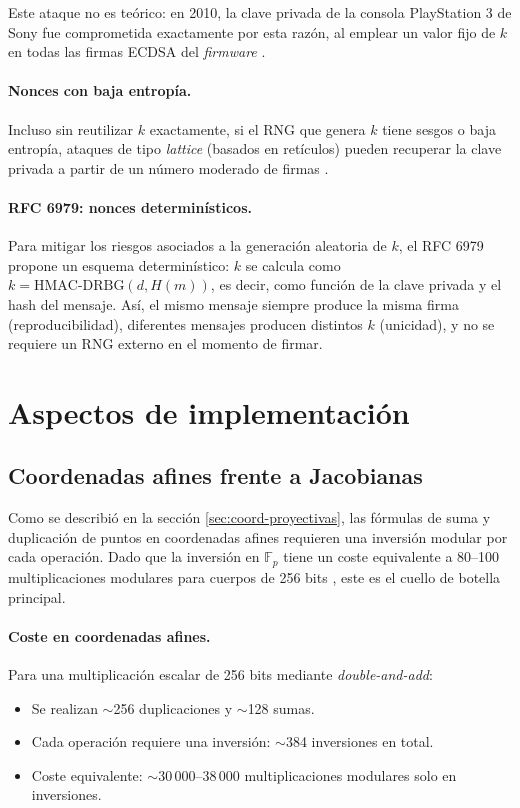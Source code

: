 Este ataque no es teórico: en 2010, la clave privada de la consola PlayStation 3 de Sony fue comprometida exactamente por esta razón, al emplear un valor fijo de $k$ en todas las firmas ECDSA del \textit{firmware} \cite{ps3-ecdsa-fail}.

\paragraph{Nonces con baja entropía.}
Incluso sin reutilizar $k$ exactamente, si el RNG que genera $k$ tiene sesgos o baja entropía, ataques de tipo \textit{lattice} (basados en retículos) pueden recuperar la clave privada a partir de un número moderado de firmas \cite{howgrave2001lattice}. 

\paragraph{RFC 6979: nonces determinísticos.}
Para mitigar los riesgos asociados a la generación aleatoria de $k$, el RFC 6979 \cite{rfc6979} propone un esquema determinístico: $k$ se calcula como $k = \text{HMAC-DRBG}(d, H(m))$, es decir, como función de la clave privada y el hash del mensaje. Así, el mismo mensaje siempre produce la misma firma (reproducibilidad), diferentes mensajes producen distintos $k$ (unicidad), y no se requiere un RNG externo en el momento de firmar.


\section{Aspectos de implementación}
\label{sec:ecc-implementacion}

\subsection{Coordenadas afines frente a Jacobianas}
\label{subsec:ecc-afines-jacobianas}

Como se describió en la sección \ref{sec:coord-proyectivas}, las fórmulas de suma y duplicación de puntos en coordenadas afines requieren una inversión modular por cada operación. Dado que la inversión en $\mathbb{F}_p$ tiene un coste equivalente a 80--100 multiplicaciones modulares para cuerpos de 256 bits \cite{hankerson2004guide}, este es el cuello de botella principal.

\paragraph{Coste en coordenadas afines.}
Para una multiplicación escalar de 256 bits mediante \textit{double-and-add}:
\begin{itemize}
    \item Se realizan $\sim$256 duplicaciones y $\sim$128 sumas.
    \item Cada operación requiere una inversión: $\sim$384 inversiones en total.
    \item Coste equivalente: $\sim$30\,000--38\,000 multiplicaciones modulares solo en inversiones.
\end{itemize}

